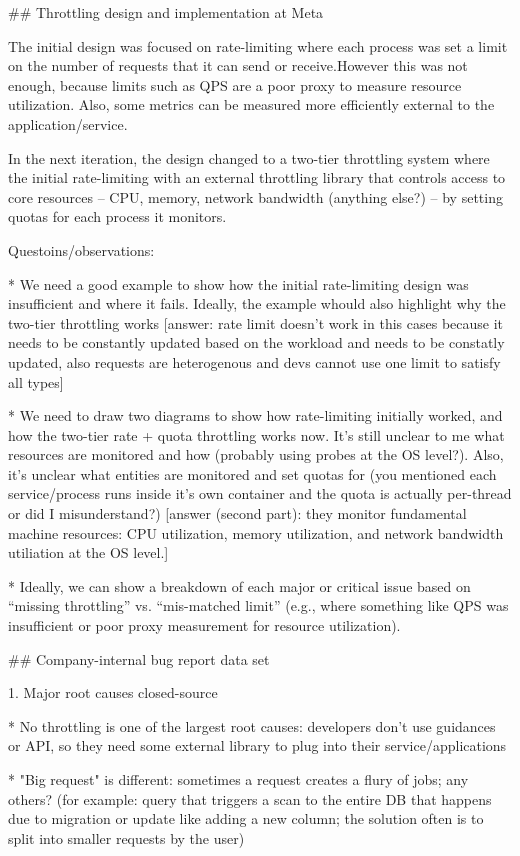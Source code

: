 ## Throttling design and implementation at Meta

The initial design was focused on rate-limiting where each process was set a limit on the number of requests that it can send or receive.However this was not enough, because limits such as QPS are a poor proxy to measure resource utilization. Also, some metrics can be measured more efficiently external to the application/service.

In the next iteration, the design changed to a two-tier throttling system where the initial rate-limiting with an external throttling library that controls access to core resources -- CPU, memory, network bandwidth (anything else?) -- by setting quotas for each process it monitors.

Questoins/observations:

* We need a good example to show how the initial rate-limiting design was insufficient and where it fails. Ideally, the example whould also highlight why the two-tier throttling works
[answer: rate limit doesn't work in this cases because it needs to be constantly updated based on the workload and needs to be constatly updated, also requests are heterogenous and devs cannot use one limit to satisfy all types]

* We need to draw two diagrams to show how rate-limiting initially worked, and how the two-tier rate + quota throttling works now. It's still unclear to me what resources are monitored and how (probably using probes at the OS level?). Also, it's unclear what entities are monitored and set quotas for (you mentioned each service/process runs inside it's own container and the quota is actually per-thread or did I misunderstand?)
[answer (second part): they monitor fundamental machine resources: CPU utilization, memory utilization, and network bandwidth utiliation at the OS level.]

* Ideally, we can show a breakdown of each major or critical issue based on ``missing throttling'' vs. ``mis-matched limit'' (e.g., where something like QPS was insufficient or poor proxy measurement for resource utilization).


## Company-internal bug report data set

1. Major root causes closed-source

* No throttling is one of the largest root causes: developers don't use guidances or API, so they need some external library to plug into their service/applications

* "Big request" is different: sometimes a request creates a flury of jobs; any others? (for example: query that triggers a scan to the entire DB that happens due to migration or update like adding a new column; the solution often is to split into smaller requests by the user)

